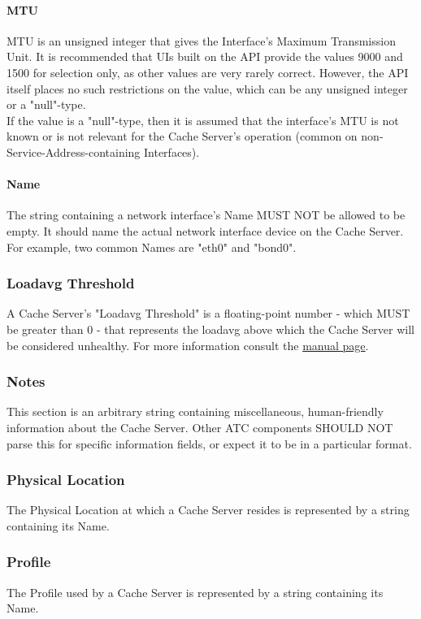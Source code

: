 \paragraph{MTU}
MTU is an unsigned integer that gives the Interface's Maximum Transmission
Unit. It is recommended that UIs built on the API provide the values 9000
and 1500 for selection only, as other values are very rarely correct. However,
the API itself places no such restrictions on the value, which can be any
unsigned integer or a "null"-type.\\
If the value is a "null"-type, then it is assumed that the interface's MTU is
not known or is not relevant for the Cache Server's operation (common on
non-Service-Address-containing Interfaces).

\paragraph{Name}
The string containing a network interface's Name MUST NOT be allowed to be
empty. It should name the actual network interface device on the Cache Server.
For example, two common Names are "eth0" and "bond0".

\subsubsection{Loadavg Threshold}
A Cache Server's "Loadavg Threshold" is a floating-point number - which MUST be
greater than 0 - that represents the loadavg above which the Cache Server will
be considered unhealthy. For more information consult the
\href{https://linux.die.net/man/3/getloadavg}{ manual page}.

\subsubsection{Notes}
This section is an arbitrary string containing miscellaneous, human-friendly
information about the Cache Server. Other ATC components SHOULD NOT parse this
for specific information fields, or expect it to be in a particular format.

\subsubsection{Physical Location}
The Physical Location at which a Cache Server resides is represented by a string
containing its Name.

\subsubsection{Profile}
The Profile used by a Cache Server is represented by a string containing its
Name.

